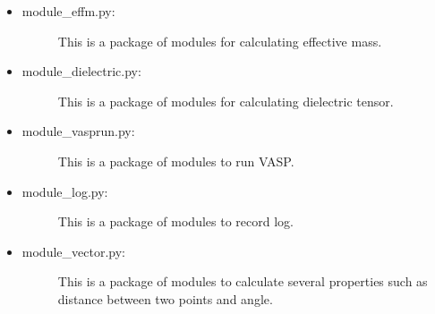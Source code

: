 \documentclass[letterpaper,10pt,english]{sphinxmanual}
\begin{document}
\begin{itemize}
\begin{description}
\end{description}

\item {} \begin{description}
\item[{module\_effm.py:}] \leavevmode
This is a package of modules for calculating effective mass.

\end{description}

\item {} \begin{description}
\item[{module\_dielectric.py:}] \leavevmode
This is a package of modules for calculating dielectric tensor.

\end{description}

\item {} \begin{description}
\item[{module\_vasprun.py:}] \leavevmode
This is a package of modules to run VASP.

\end{description}

\item {} \begin{description}
\item[{module\_log.py:}] \leavevmode
This is a package of modules to record log.

\end{description}

\item {} \begin{description}
\item[{module\_vector.py:}] \leavevmode
This is a package of modules to calculate several properties such as distance between two points and angle.

\end{description}

\end{itemize}
\end{document}
